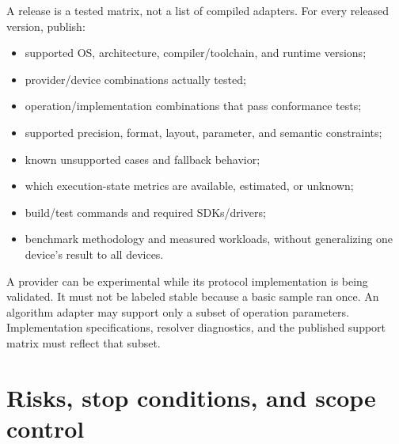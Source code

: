 A release is a tested matrix, not a list of compiled adapters. For every released version, publish:
\begin{itemize}
  \item supported OS, architecture, compiler/toolchain, and runtime versions;
  \item provider/device combinations actually tested;
  \item operation/implementation combinations that pass conformance tests;
  \item supported precision, format, layout, parameter, and semantic constraints;
  \item known unsupported cases and fallback behavior;
  \item which execution-state metrics are available, estimated, or unknown;
  \item build/test commands and required SDKs/drivers;
  \item benchmark methodology and measured workloads, without generalizing one device's result to all devices.
\end{itemize}

A provider can be experimental while its protocol implementation is being validated. It must not be labeled stable because a basic sample ran once. An algorithm adapter may support only a subset of operation parameters. Implementation specifications, resolver diagnostics, and the published support matrix must reflect that subset.

\section{Risks, stop conditions, and scope control}

